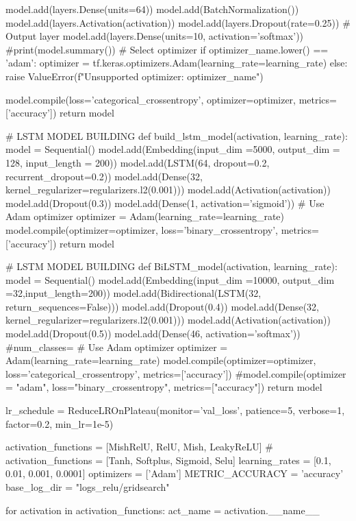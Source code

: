     model.add(layers.Dense(units=64))
    model.add(BatchNormalization())
    model.add(layers.Activation(activation))
    model.add(layers.Dropout(rate=0.25))
    # Output layer
    model.add(layers.Dense(units=10, activation='softmax'))
    #print(model.summary())
    # Select optimizer 
    if optimizer_name.lower() == 'adam':
        optimizer = tf.keras.optimizers.Adam(learning_rate=learning_rate)
    else:
        raise ValueError(f"Unsupported optimizer: {optimizer_name}")

    model.compile(loss='categorical_crossentropy', optimizer=optimizer, metrics=['accuracy'])
    return model

# LSTM MODEL BUILDING
def build_lstm_model(activation, learning_rate):
    model = Sequential()
    model.add(Embedding(input_dim =5000, output_dim = 128, input_length = 200))
    model.add(LSTM(64, dropout=0.2, recurrent_dropout=0.2))
    model.add(Dense(32, kernel_regularizer=regularizers.l2(0.001)))
    model.add(Activation(activation))
    model.add(Dropout(0.3))
    model.add(Dense(1, activation='sigmoid'))
    # Use Adam optimizer 
    optimizer = Adam(learning_rate=learning_rate)
    model.compile(optimizer=optimizer, loss='binary_crossentropy', metrics=['accuracy'])
    return model
    
# LSTM MODEL BUILDING
def BiLSTM_model(activation, learning_rate):
    model = Sequential()
    model.add(Embedding(input_dim =10000, output_dim =32,input_length=200))
    model.add(Bidirectional(LSTM(32, return_sequences=False)))
    model.add(Dropout(0.4))
    model.add(Dense(32, kernel_regularizer=regularizers.l2(0.001)))
    model.add(Activation(activation))
    model.add(Dropout(0.5))
    model.add(Dense(46, activation='softmax')) #num_classes=
    # Use Adam optimizer 
    optimizer = Adam(learning_rate=learning_rate)
    model.compile(optimizer=optimizer, loss='categorical_crossentropy', metrics=['accuracy'])
    #model.compile(optimizer = "adam", loss="binary_crossentropy", metrics=["accuracy"])
    return model

lr_schedule = ReduceLROnPlateau(monitor='val_loss', patience=5, verbose=1, factor=0.2, min_lr=1e-5)

activation_functions = [MishRelU, RelU, Mish, LeakyReLU]
# activation_functions = [Tanh, Softplus, Sigmoid, Selu]
learning_rates = [0.1, 0.01, 0.001, 0.0001]
optimizers = ['Adam']
METRIC_ACCURACY = 'accuracy'
base_log_dir = "logs_relu/gridsearch"

for activation in activation_functions:
    act_name = activation.__name__
    
